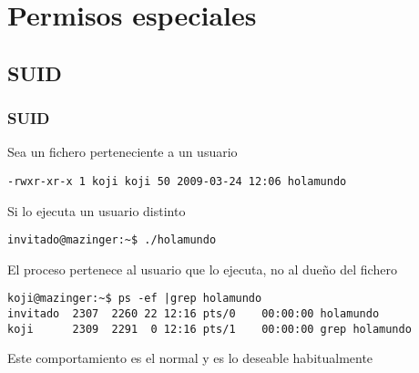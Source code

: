 \documentclass[ucs]{beamer}
\begin{document}
\section{Permisos especiales}

\subsection{SUID}
\begin{frame}[fragile]
\frametitle{SUID}
Sea un fichero perteneciente a un usuario
  \begin{footnotesize}
  \begin{verbatim}
-rwxr-xr-x 1 koji koji 50 2009-03-24 12:06 holamundo
  \end{verbatim}
  \end{footnotesize}
Si lo ejecuta un usuario distinto
  \begin{footnotesize}
  \begin{verbatim}
invitado@mazinger:~$ ./holamundo
  \end{verbatim}
  \end{footnotesize}
El proceso pertenece al usuario que lo ejecuta, no al dueño del fichero

  \begin{scriptsize}
  \begin{verbatim}
koji@mazinger:~$ ps -ef |grep holamundo
invitado  2307  2260 22 12:16 pts/0    00:00:00 holamundo
koji      2309  2291  0 12:16 pts/1    00:00:00 grep holamundo
  \end{verbatim}
  \end{scriptsize}

Este comportamiento es el normal y es lo deseable habitualmente
\end{frame}
\end{document}

